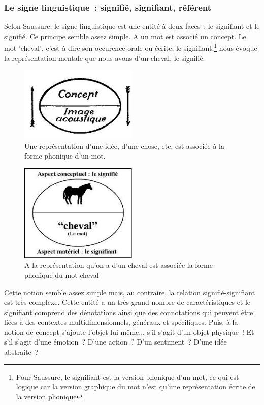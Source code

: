 \documentclass[a4paper,11pt,french]{article}
\begin{document}
\subsubsection{Le signe linguistique~: signifié, signifiant, référent}

Selon Saussure, le signe linguistique est une entité à deux faces~: le signifiant et le signifié. Ce principe semble assez simple. A un mot est associé un concept. Le mot 'cheval', c'est-à-dire son occurence orale ou écrite, le signifiant,\footnote{Pour Saussure, le signifiant est la version phonique d'un mot, ce qui est logique car la version graphique du mot n'est qu'une représentation écrite de la version phonique} nous évoque la représentation mentale que nous avons d'un cheval, le signifié. 


\begin{figure}[h!]
  \centering
      \includegraphics[width=0.5\textwidth]{img/signe-conceptimageacoustique.jpeg}
  \caption{Une représentation d'une idée, d'une chose, etc. est associée à la forme phonique d'un mot.}
\end{figure}

\begin{figure}[h!]
  \centering
      \includegraphics[width=0.5\textwidth]{img/signe-cheval.jpeg}
  \caption{A la représentation qu'on a d'un cheval est associée la forme phonique du mot cheval}
\end{figure}

Cette notion semble assez simple mais, au contraire, la relation signifié-signifiant est très complexe. Cette entité a un très grand nombre de caractéristiques et le signifiant comprend des dénotations ainsi que des connotations qui peuvent être liées à des contextes multidimensionnels, généraux et spécifiques. Puis, à la notion de concept s'ajoute l'objet lui-même... s'il s'agit d'un objet physique~! Et s'il s'agit d'une émotion~? D'une action~? D'un sentiment~? D'une idée abstraite~? 
\end{document}
